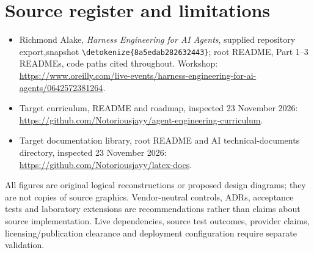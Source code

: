 \documentclass[11pt,letterpaper]{article}
\newcommand{\src}[1]{\expandafter\nolinkurl\expandafter{\detokenize{#1}}}
\begin{document}
\section{Source register and limitations}
\begin{itemize}
\item Richmond Alake, \textit{Harness Engineering for AI Agents}, supplied repository export,\newline snapshot \src{8a5edab282632443}; root README, Part 1--3 READMEs, code paths cited throughout. Workshop: \url{https://www.oreilly.com/live-events/harness-engineering-for-ai-agents/0642572381264}.
\item Target curriculum, README and roadmap, inspected 23 November 2026: \url{https://github.com/Notoriousjayy/agent-engineering-curriculum}.
\item Target documentation library, root README and AI technical-documents directory, inspected 23 November 2026: \url{https://github.com/Notoriousjayy/latex-docs}.
\end{itemize}
All figures are original logical reconstructions or proposed design diagrams; they are not copies of source graphics. Vendor-neutral controls, ADRs, acceptance tests and laboratory extensions are recommendations rather than claims about source implementation. Live dependencies, source test outcomes, provider claims, licensing/publication clearance and deployment configuration require separate validation.
\end{document}
